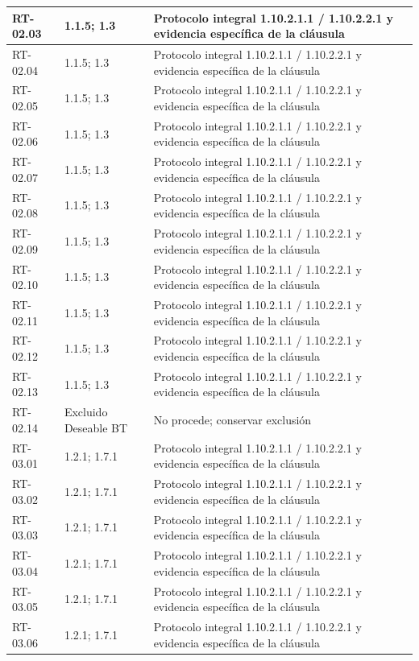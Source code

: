 \begin{longtable}{L{23mm}L{46mm}L{72mm}}
RT-02.03 & 1.1.5; 1.3 & Protocolo integral 1.10.2.1.1 / 1.10.2.2.1 y evidencia específica de la cláusula\\\hline
RT-02.04 & 1.1.5; 1.3 & Protocolo integral 1.10.2.1.1 / 1.10.2.2.1 y evidencia específica de la cláusula\\\hline
RT-02.05 & 1.1.5; 1.3 & Protocolo integral 1.10.2.1.1 / 1.10.2.2.1 y evidencia específica de la cláusula\\\hline
RT-02.06 & 1.1.5; 1.3 & Protocolo integral 1.10.2.1.1 / 1.10.2.2.1 y evidencia específica de la cláusula\\\hline
RT-02.07 & 1.1.5; 1.3 & Protocolo integral 1.10.2.1.1 / 1.10.2.2.1 y evidencia específica de la cláusula\\\hline
RT-02.08 & 1.1.5; 1.3 & Protocolo integral 1.10.2.1.1 / 1.10.2.2.1 y evidencia específica de la cláusula\\\hline
RT-02.09 & 1.1.5; 1.3 & Protocolo integral 1.10.2.1.1 / 1.10.2.2.1 y evidencia específica de la cláusula\\\hline
RT-02.10 & 1.1.5; 1.3 & Protocolo integral 1.10.2.1.1 / 1.10.2.2.1 y evidencia específica de la cláusula\\\hline
RT-02.11 & 1.1.5; 1.3 & Protocolo integral 1.10.2.1.1 / 1.10.2.2.1 y evidencia específica de la cláusula\\\hline
RT-02.12 & 1.1.5; 1.3 & Protocolo integral 1.10.2.1.1 / 1.10.2.2.1 y evidencia específica de la cláusula\\\hline
RT-02.13 & 1.1.5; 1.3 & Protocolo integral 1.10.2.1.1 / 1.10.2.2.1 y evidencia específica de la cláusula\\\hline
RT-02.14 & Excluido Deseable BT & No procede; conservar exclusión\\\hline
RT-03.01 & 1.2.1; 1.7.1 & Protocolo integral 1.10.2.1.1 / 1.10.2.2.1 y evidencia específica de la cláusula\\\hline
RT-03.02 & 1.2.1; 1.7.1 & Protocolo integral 1.10.2.1.1 / 1.10.2.2.1 y evidencia específica de la cláusula\\\hline
RT-03.03 & 1.2.1; 1.7.1 & Protocolo integral 1.10.2.1.1 / 1.10.2.2.1 y evidencia específica de la cláusula\\\hline
RT-03.04 & 1.2.1; 1.7.1 & Protocolo integral 1.10.2.1.1 / 1.10.2.2.1 y evidencia específica de la cláusula\\\hline
RT-03.05 & 1.2.1; 1.7.1 & Protocolo integral 1.10.2.1.1 / 1.10.2.2.1 y evidencia específica de la cláusula\\\hline
RT-03.06 & 1.2.1; 1.7.1 & Protocolo integral 1.10.2.1.1 / 1.10.2.2.1 y evidencia específica de la cláusula\\\hline

\end{longtable}

